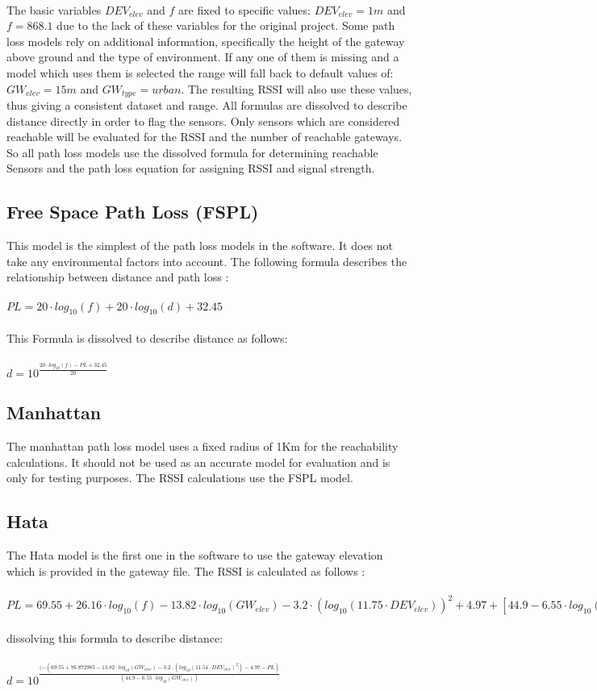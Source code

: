\documentclass[12pt,a4paper]{article}
\begin{document}
\\The basic variables $DEV_{elev}$ and $f$ are fixed to specific values: $DEV_{elev} = 1m$ and $f=868.1$ due to the lack of these variables for the original project. Some path loss models rely on additional information, specifically the height of the gateway above ground and the type of environment. If any one of them is missing and a model which uses them is selected the range will fall back to default values of: $GW_{elev}=15m$ and $GW_{type}=urban$. The resulting RSSI will also use these values, thus giving a consistent dataset and range. All formulas are dissolved to describe distance directly in order to flag the sensors. Only sensors which are considered reachable will be evaluated for the RSSI and the number of reachable gateways. So all path loss models use the dissolved formula for determining reachable Sensors and the path loss equation for assigning RSSI and signal strength.
\subsection{Free Space Path Loss (FSPL)}
This model is the simplest of the path loss models in the software. It does not take any environmental factors into account. The following formula describes the relationship between distance and path loss \cite{ericsson_cost231}:\\
\\
$PL=20\cdot log_{10}(f)+20\cdot log_{10}(d)+32.45$\\
\\
This Formula is dissolved to describe distance as follows:\\
\\
$d=10^{\frac{20\cdot log_{10}(f)-PL+32.45}{20}}$
\subsection{Manhattan}
The manhattan path loss model uses a fixed radius of 1Km for the reachability calculations. It should not be used as an accurate model for evaluation and is only for testing purposes. The RSSI calculations use the FSPL model.
\subsection{Hata}
The Hata model is the first one in the software to use the gateway elevation which is provided in the gateway file. The RSSI is calculated as follows \cite{hata}:\\
\\
$PL=69.55+26.16\cdot log_{10}(f)-13.82\cdot log_{10}(GW_{elev})-3.2\cdot (log_{10}(11.75\cdot DEV_{elev}))^{2}+4.97+[44.9-6.55\cdot log_{10}(GW_{elev})]\cdot log_{10}(d)$\\
\\
dissolving this formula to describe distance:\\
\\
$d = 10^{\frac{(-(69.55+76.872985-13.82\cdot log_{10}(GW_{elev})-3.2\cdot (log_{10}(
		11.54\cdot DEV_{elev})^2)-4.97-PL)}{(44.9-6.55\cdot log_{10}(GW_{elev}))}}$
\end{document}
